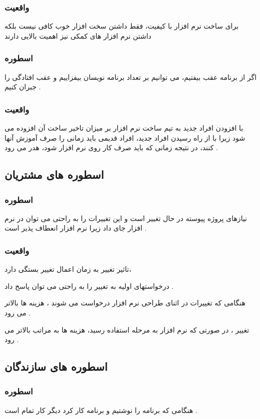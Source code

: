 \documentclass{article}
\begin{document}
\subsubsection{واقعیت}
برای ساخت نرم افزار با کیفیت، فقط داشتن سخت افزار خوب کافی نیست بلکه داشتن نرم افزار های کمکی نیز اهمیت بالایی دارند


\subsubsection{اسطوره}
اگر از برنامه عقب بیفتیم، می توانیم بر تعداد برنامه نویسان بیفزاییم و عقب افتادگی را جبران کنیم .


\subsubsection{واقعیت}
با افزودن افراد جدید به تیم ساخت نرم افزار بر میزان تاخیر ساخت آن افزوده می شود زیرا با از راه رسیدن افراد جدید، افراد قدیمی باید زمانی را صرف آموزش آنها کنند، در نتیجه زمانی که باید صرف کار روی نرم افزار شود، هدر می رود .



\subsection{اسطوره های مشتریان}

\subsubsection{اسطوره}
نیازهای پروژه پیوسته در حال تغییر است و این تغییرات را به راحتی می توان در نرم افزار جای داد زیرا نرم افزار انعطاف پذیر است .


\subsubsection{واقعیت}
تاثیر تغییر به زمان اعمال تغییر بستگی دارد، 

درخواستهای اولیه به تغییر را به راحتی می توان پاسخ داد .

هنگامی که تغییرات در اثنای طراحی نرم افزار درخواست می شوند ، هزینه ها بالاتر می رود .

تغییر ، در صورتی که نرم افزار به مرحله استفاده رسید، هزینه ها به مراتب بالاتر می رود .


\subsection{اسطوره های سازندگان}


\subsubsection{اسطوره}
هنگامی که برنامه را نوشتیم و برنامه کار کرد دیگر کار تمام است .
\end{document}
